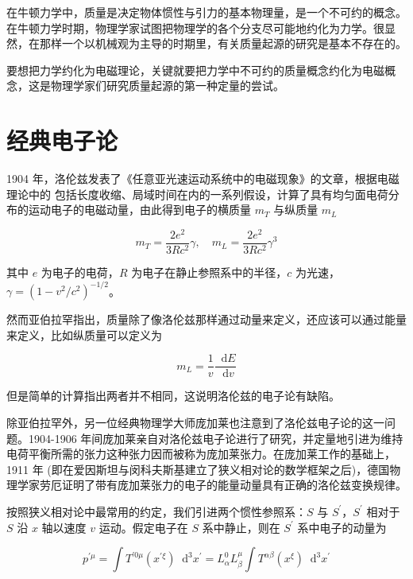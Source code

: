 \documentclass[oneside,a4paper,openany,11pt]{ctexbook}
\newcommand*{\dif}{\mathop{}\!\mathrm{d}} %
\begin{document}
在牛顿力学中，质量是决定物体惯性与引力的基本物理量，是一个不可约的概念。在牛顿力学时期，物理学家试图把物理学的各个分支尽可能地约化为力学。很显然，在那样一个以机械观为主导的时期里，有关质量起源的研究是基本不存在的。

要想把力学约化为电磁理论，关键就要把力学中不可约的质量概念约化为电磁概念，这是物理学家们研究质量起源的第一种定量的尝试。

\section{经典电子论}

1904 年，洛伦兹发表了《任意亚光速运动系统中的电磁现象》的文章，根据电磁理论中的
包括长度收缩、局域时间在内的一系列假设，计算了具有均匀面电荷分布的运动电子的电磁动量，由此得到电子的横质量 $m_T$ 与纵质量 $m_L$

\begin{equation}
    m_T = \frac{2 e^2}{3 R c^2} \gamma, \quad m_L = \frac{2 e^2}{3 R c^2} \gamma^3
\end{equation}

\noindent 其中 $e$ 为电子的电荷，$R$ 为电子在静止参照系中的半径，$c$ 为光速，$\gamma=(1-v^2/c^2)^{-1/2}$。

\noindent 然而亚伯拉罕指出，质量除了像洛伦兹那样通过动量来定义，还应该可以通过能量来定义，比如纵质量可以定义为

\begin{equation}
    m_L = \frac{1}{v} \frac{\dif E}{\dif v}
\end{equation}

但是简单的计算指出两者并不相同，这说明洛伦兹的电子论有缺陷。

除亚伯拉罕外，另一位经典物理学大师庞加莱也注意到了洛伦兹电子论的这一问题。1904-1906 年间庞加莱亲自对洛伦兹电子论进行了研究，并定量地引进为维持电荷平衡所需的张力这种张力因而被称为庞加莱张力。在庞加莱工作的基础上，1911 年 (即在爱因斯坦与闵科夫斯基建立了狭义相对论的数学框架之后)，德国物理学家劳厄证明了带有庞加莱张力的电子的能量动量具有正确的洛伦兹变换规律。

按照狭义相对论中最常用的约定，我们引进两个惯性参照系：$S$ 与 $S^\prime$，$S^\prime$ 相对于 $S$ 沿 $x$ 轴以速度 $v$ 运动。假定电子在 $S$ 系中静止，则在 $S^\prime$ 系中电子的动量为

\begin{equation}
    p^{\prime \mu} = \int T^{\prime 0\mu} (x^{\prime \xi}) \dif^3 x^\prime = L_\alpha^0 L_\beta^\mu \int T^{\alpha\beta} (x^{\xi}) \dif^3 x^\prime
\end{equation}
\end{document}
